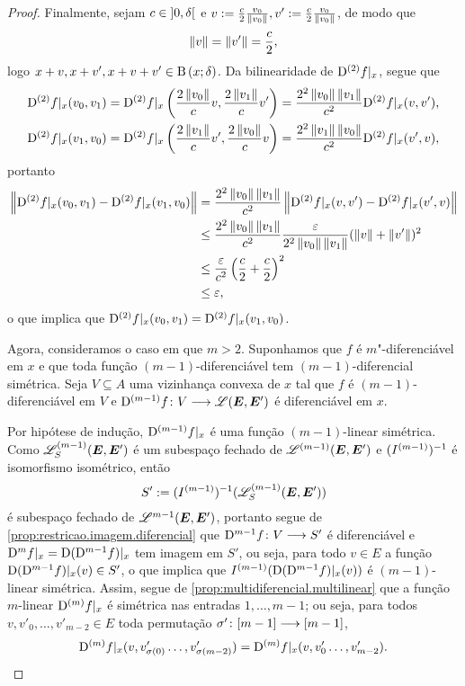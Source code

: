 \begin{proof}
Finalmente, sejam $c \in \left]0,\allowbreak \delta\right[$ e $v := \frac{c}{2}\frac{v_0}{\left\Vert{v_0}\right\Vert}, v' := \frac{c}{2}\frac{v_0}{\left\Vert{v_0}\right\Vert}$, de modo que
	\begin{equation*}
	\left\Vert{v}\right\Vert = \left\Vert{v'}\right\Vert = \frac{c}{2},
	\end{equation*}
logo $x+v, x+v',x+v+v' \in \mathrm{B}\left(x; \delta\right)$. Da bilinearidade de $\mathrm{D}^{(2)} f|_x$, segue que
	\begin{align*}
		\mathrm{D}^{(2)} f|_x(v_0,v_1) &= \mathrm{D}^{(2)} f|_x \left( \frac{2\left\Vert{v_0}\right\Vert}{c} v, \frac{2\left\Vert{v_1}\right\Vert}{c} v' \right) = \frac{2^2\left\Vert{v_0}\right\Vert\left\Vert{v_1}\right\Vert}{c^2} \mathrm{D}^{(2)} f|_x(v,v'), \\
		\mathrm{D}^{(2)} f|_x(v_1,v_0) &= \mathrm{D}^{(2)} f|_x \left( \frac{2\left\Vert{v_1}\right\Vert}{c} v', \frac{2\left\Vert{v_0}\right\Vert}{c} v \right) = \frac{2^2\left\Vert{v_1}\right\Vert\left\Vert{v_0}\right\Vert}{c^2} \mathrm{D}^{(2)} f|_x(v',v),
	\end{align*}
portanto
	\begin{align*}
	\left\Vert{\mathrm{D}^{(2)} f|_x(v_0,v_1) - \mathrm{D}^{(2)} f|_x(v_1,v_0)}\right\Vert &= \frac{2^2\left\Vert{v_0}\right\Vert\left\Vert{v_1}\right\Vert}{c^2}\left\Vert{\mathrm{D}^{(2)} f|_x(v,v') - \mathrm{D}^{(2)} f|_x(v',v)}\right\Vert \\
		&\leq \frac{2^2\left\Vert{v_0}\right\Vert\left\Vert{v_1}\right\Vert}{c^2} \frac{\varepsilon}{2^2\left\Vert{v_0}\right\Vert\left\Vert{v_1}\right\Vert} (\left\Vert{v}\right\Vert + \left\Vert{v'}\right\Vert)^2 \\
		&\leq \frac{\varepsilon}{c^2} \left( \frac{c}{2} + \frac{c}{2} \right)^2 \\
		&\leq \varepsilon,
	\end{align*}
o que implica que $\mathrm{D}^{(2)} f|_x(v_0,v_1) = \mathrm{D}^{(2)} f|_x(v_1,v_0)$.

Agora, consideramos o caso em que $m>2$. Suponhamos que $f$ é $m$"-diferenciável em $x$ e que toda função $(m-1)$-diferenciável tem $(m-1)$-diferencial simétrica. Seja $V \subseteq A$ uma vizinhança convexa de $x$ tal que $f$ é $(m-1)$-diferenciável em $V$ e $\mathrm{D}^{(m-1)} f\colon \allowbreak V \longrightarrow \mathscr{L}(\bm E, \bm E')$ é diferenciável em $x$.

Por hipótese de indução, $\mathrm{D}^{(m-1)} f|_x$ é uma função $(m-1)$-linear simétrica. Como $\mathscr{L}_{S}^{(m-1)}(\bm E, \bm E')$ é um subespaço fechado de $\mathscr{L}^{(m-1)}(\bm E, \bm E')$ e $(I^{(m-1)})^{-1}$ é isomorfismo isométrico, então
	\begin{equation*}
	S' := (I^{(m-1)})^{-1}(\mathscr{L}_{S}^{(m-1)}(\bm E, \bm E'))
	\end{equation*}
é subespaço fechado de $\mathscr{L}^{m-1}(\bm E, \bm E')$, portanto segue de \ref{prop:restricao.imagem.diferencial} que $\mathrm{D}^{m-1} f\colon \allowbreak V \longrightarrow S'$ é diferenciável e $\mathrm{D}^m f|_x = \mathrm{D} (\mathrm{D}^{m-1} f)|_x$ tem imagem em $S'$, ou seja, para todo $v \in E$ a função $\mathrm{D} (\mathrm{D}^{m-1} f)|_x(v) \in S'$, o que implica que $I^{(m-1)}(\mathrm{D} (\mathrm{D}^{m-1} f)|_x(v))$ é $(m-1)$-linear simétrica. Assim, segue de \ref{prop:multidiferencial.multilinear} que a função $m$-linear $\mathrm{D}^{(m)} f|_x$ é simétrica nas entradas $1, \ldots, m-1$; ou seja, para todos $v, v'_0, \ldots, v'_{m-2} \in E$ toda permutação $\sigma'\colon \allowbreak [m-1] \longrightarrow [m-1]$,
	\begin{equation*}
	\mathrm{D}^{(m)} f|_x (v, v'_{\sigma(0)} \ldots, v'_{\sigma(m-2)}) = \mathrm{D}^{(m)} f|_x (v, v'_0 \ldots, v'_{m-2}).
	\end{equation*}


\end{proof}
